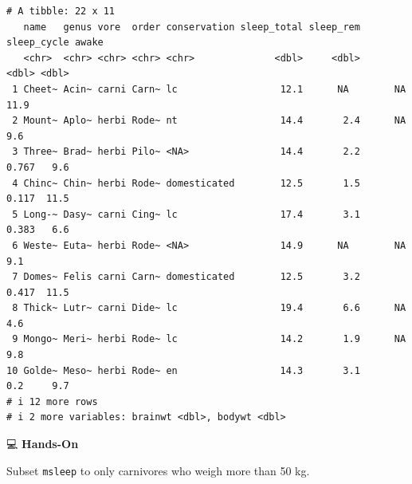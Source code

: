 \documentclass[
  letterpaper,
  DIV=11,
  numbers=noendperiod]{scrreprt}
\begin{document}
\begin{tcolorbox}
\begin{verbatim}
# A tibble: 22 x 11
   name   genus vore  order conservation sleep_total sleep_rem sleep_cycle awake
   <chr>  <chr> <chr> <chr> <chr>              <dbl>     <dbl>       <dbl> <dbl>
 1 Cheet~ Acin~ carni Carn~ lc                  12.1      NA        NA      11.9
 2 Mount~ Aplo~ herbi Rode~ nt                  14.4       2.4      NA       9.6
 3 Three~ Brad~ herbi Pilo~ <NA>                14.4       2.2       0.767   9.6
 4 Chinc~ Chin~ herbi Rode~ domesticated        12.5       1.5       0.117  11.5
 5 Long-~ Dasy~ carni Cing~ lc                  17.4       3.1       0.383   6.6
 6 Weste~ Euta~ herbi Rode~ <NA>                14.9      NA        NA       9.1
 7 Domes~ Felis carni Carn~ domesticated        12.5       3.2       0.417  11.5
 8 Thick~ Lutr~ carni Dide~ lc                  19.4       6.6      NA       4.6
 9 Mongo~ Meri~ herbi Rode~ lc                  14.2       1.9      NA       9.8
10 Golde~ Meso~ herbi Rode~ en                  14.3       3.1       0.2     9.7
# i 12 more rows
# i 2 more variables: brainwt <dbl>, bodywt <dbl>
\end{verbatim}

\end{tcolorbox}

💻 \textbf{Hands-On}

Subset \texttt{msleep} to only carnivores who weigh more than 50 kg.
\end{document}
